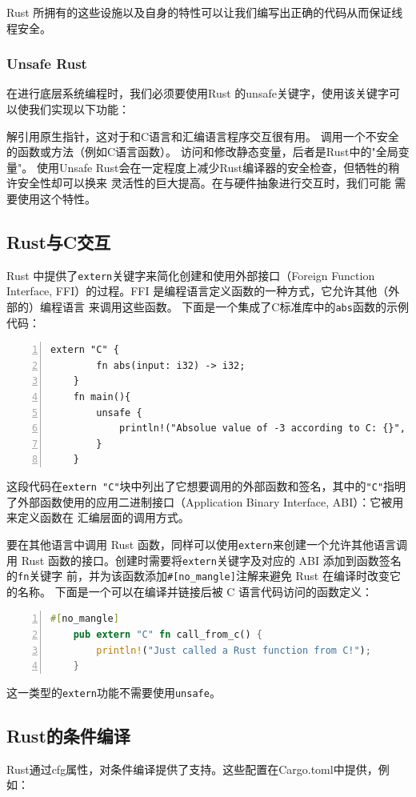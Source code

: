 \documentclass{../runikraft-report}
\begin{document}
Rust 所拥有的这些设施以及自身的特性可以让我们编写出正确的代码从而保证线程安全。\cite{9}

\subsubsection{Unsafe Rust}
在进行底层系统编程时，我们必须要使用Rust 的unsafe关键字，使用该关键字可以使我们实现以下功能：

解引用原生指针，这对于和C语言和汇编语言程序交互很有用。
调用一个不安全的函数或方法（例如C语言函数）。
访问和修改静态变量，后者是Rust中的"全局变量"。
使用Unsafe Rust会在一定程度上减少Rust编译器的安全检查，但牺牲的稍许安全性却可以换来
灵活性的巨大提高。在与硬件抽象进行交互时，我们可能
需要使用这个特性。

\subsection{Rust与C交互}
Rust 中提供了\texttt{extern}关键字来简化创建和使用外部接口（Foreign Function
Interface, FFI）的过程。FFI 是编程语言定义函数的一种方式，它允许其他（外部的）编程语言
来调用这些函数。
下面是一个集成了C标准库中的\texttt{abs}函数的示例代码：
\begin{lstlisting}[numbers=left]
	extern "C" {
		fn abs(input: i32) -> i32;
	}
	fn main(){
		unsafe {
			println!("Absolue value of -3 according to C: {}", abs(-3));
		}
	}
\end{lstlisting}
这段代码在\texttt{extern "C"}块中列出了它想要调用的外部函数和签名，其中的\texttt{"C"}指明
了外部函数使用的应用二进制接口（Application Binary Interface, ABI）：它被用来定义函数在
汇编层面的调用方式。

要在其他语言中调用 Rust 函数，同样可以使用\texttt{extern}来创建一个允许其他语言调用 Rust
函数的接口。创建时需要将\texttt{extern}关键字及对应的 ABI 添加到函数签名的\texttt{fn}关键字
前，并为该函数添加\texttt{\#[no\_mangle]}注解来避免 Rust 在编译时改变它的名称。
下面是一个可以在编译并链接后被 C 语言代码访问的函数定义：
\begin{lstlisting}[numbers=left,language=Rust]
	#[no_mangle]
	pub extern "C" fn call_from_c() {
		println!("Just called a Rust function from C!");
	}
\end{lstlisting}
这一类型的\texttt{extern}功能不需要使用\texttt{unsafe}。

\subsection{Rust的条件编译}\label{subsec:cond-compile}
Rust通过cfg属性，对条件编译提供了支持。这些配置在Cargo.toml中提供，例如：
\end{document}
